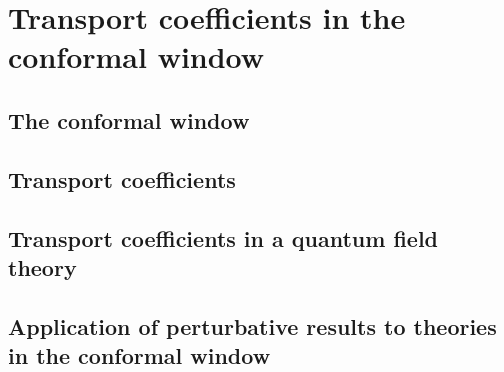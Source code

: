 \chapter{Transport coefficients in the conformal window}


\section{The conformal window}
\label{ conformal_window}




\section{Transport coefficients}



\section{Transport coefficients in a quantum field theory}



\section{Application of perturbative results to theories in the conformal window}

